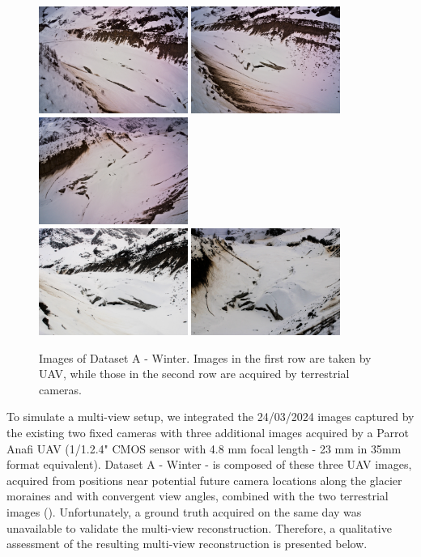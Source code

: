 \begin{figure}
  \centering
    \includegraphics[height=3.5cm]{winter_img_1}
    \includegraphics[height=3.5cm]{winter_img_2}
    \includegraphics[height=3.5cm]{winter_img_5} \\ \vspace{1mm}
    \includegraphics[height=3.5cm]{winter_img_3}
    \includegraphics[height=3.5cm]{winter_img_4}
  \caption{Images of Dataset A - Winter. Images in the first row are taken by UAV, while those in the second row are acquired by terrestrial cameras.}
  \label{fig:5:winter_images}
\end{figure}

To simulate a multi-view setup, we integrated the 24/03/2024 images captured by the existing two fixed cameras with three additional images acquired by a Parrot Anafi UAV (1/1.2.4" CMOS sensor with 4.8 mm focal length - 23 mm in 35mm format equivalent).
Dataset A - Winter - is composed of these three UAV images, acquired from positions near potential future camera locations along the glacier moraines and with convergent view angles, combined with the two terrestrial images ().
Unfortunately, a ground truth acquired on the same day was unavailable to validate the multi-view reconstruction. 
Therefore, a qualitative assessment of the resulting multi-view reconstruction is presented below.

